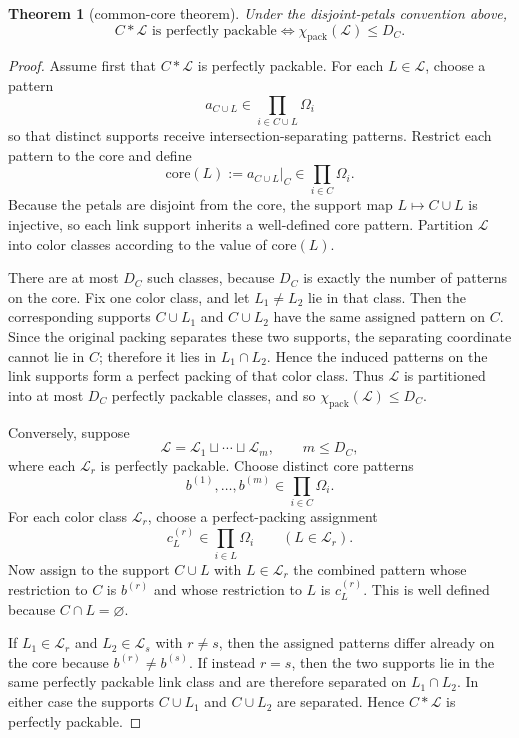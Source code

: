 \documentclass[11pt]{article}
\newtheorem{theorem}{Theorem}[section]
\theoremstyle{definition}
\newcommand{\Chi}{\chi}
\newcommand{\pack}{\mathrm{pack}}
\newcommand{\Lk}{\mathcal L}
\newcommand{\core}{\mathrm{core}}
\begin{document}
\begin{theorem}[common-core theorem]\label{thm:common-core}
Under the disjoint-petals convention above,
\[
C*\Lk\text{ is perfectly packable}
\iff
\Chi_{\pack}(\Lk)\le D_C.
\]
\end{theorem}

\begin{proof}
Assume first that \(C*\Lk\) is perfectly packable. For each \(L\in\Lk\), choose a pattern
\[
a_{C\cup L}\in \prod_{i\in C\cup L}\Omega_i
\]
so that distinct supports receive intersection-separating patterns. Restrict each pattern to the core and define
\[
\core(L):=a_{C\cup L}|_C\in \prod_{i\in C}\Omega_i.
\]
Because the petals are disjoint from the core, the support map \(L\mapsto C\cup L\) is injective, so each link support inherits a well-defined core pattern. Partition \(\Lk\) into color classes according to the value of \(\core(L)\).

There are at most \(D_C\) such classes, because \(D_C\) is exactly the number of patterns on the core. Fix one color class, and let \(L_1\neq L_2\) lie in that class. Then the corresponding supports \(C\cup L_1\) and \(C\cup L_2\) have the same assigned pattern on \(C\). Since the original packing separates these two supports, the separating coordinate cannot lie in \(C\); therefore it lies in \(L_1\cap L_2\). Hence the induced patterns on the link supports form a perfect packing of that color class. Thus \(\Lk\) is partitioned into at most \(D_C\) perfectly packable classes, and so \(\Chi_{\pack}(\Lk)\le D_C\).

Conversely, suppose
\[
\Lk=\Lk_1\sqcup\cdots\sqcup \Lk_m,
\qquad m\le D_C,
\]
where each \(\Lk_r\) is perfectly packable. Choose distinct core patterns
\[
b^{(1)},\dots,b^{(m)}\in \prod_{i\in C}\Omega_i.
\]
For each color class \(\Lk_r\), choose a perfect-packing assignment
\[
c^{(r)}_L\in \prod_{i\in L}\Omega_i
\qquad(L\in \Lk_r).
\]
Now assign to the support \(C\cup L\) with \(L\in \Lk_r\) the combined pattern whose restriction to \(C\) is \(b^{(r)}\) and whose restriction to \(L\) is \(c^{(r)}_L\). This is well defined because \(C\cap L=\varnothing\).

If \(L_1\in \Lk_r\) and \(L_2\in \Lk_s\) with \(r\neq s\), then the assigned patterns differ already on the core because \(b^{(r)}\neq b^{(s)}\). If instead \(r=s\), then the two supports lie in the same perfectly packable link class and are therefore separated on \(L_1\cap L_2\). In either case the supports \(C\cup L_1\) and \(C\cup L_2\) are separated. Hence \(C*\Lk\) is perfectly packable.
\end{proof}
\end{document}
